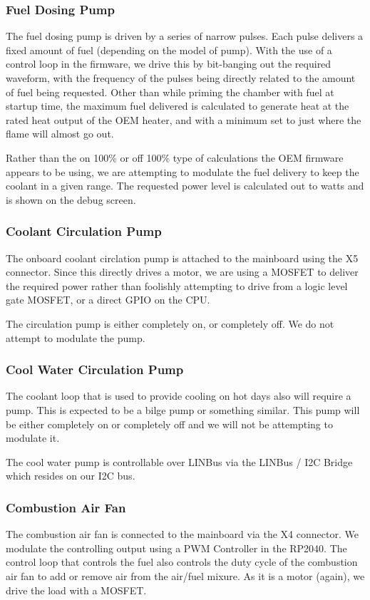 \documentclass[lettersize,journal]{IEEEtran}
\begin{document}
\subsubsection{Fuel Dosing Pump}
The fuel dosing pump is driven by a series of narrow pulses.  Each pulse delivers a fixed amount of fuel (depending on the model of pump).  With the use of a control loop in the firmware, we drive this by bit-banging out the required waveform, with the frequency of the pulses being directly related to the amount of fuel being requested.  Other than while priming the chamber with fuel at startup time, the maximum fuel delivered is calculated to generate heat at the rated heat output of the OEM heater, and with a minimum set to just where the flame will almost go out.

Rather than the on 100\% or off 100\% type of calculations the OEM firmware appears to be using, we are attempting to modulate the fuel delivery to keep the coolant in a given range.  The requested power level is calculated out to watts and is shown on the debug screen. 

\subsubsection{Coolant Circulation Pump}
The onboard coolant circlation pump is attached to the mainboard using the X5 connector.  Since this directly drives a motor, we are using a MOSFET to deliver the required power rather than foolishly attempting to drive from a logic level gate MOSFET, or a direct GPIO on the CPU.

The circulation pump is either completely on, or completely off.  We do not attempt to modulate the pump.

\subsubsection{Cool Water Circulation Pump}
The coolant loop that is used to provide cooling on hot days also will require a pump.  This is expected to be a bilge pump or something similar.  This pump will be either completely on or completely off and we will not be attempting to modulate it.

The cool water pump is controllable over LINBus via the LINBus / I2C Bridge which resides on our I2C bus.

\subsubsection{Combustion Air Fan}
The combustion air fan is connected to the mainboard via the X4 connector.  We modulate the controlling output using a PWM Controller in the RP2040.  The control loop that controls the fuel also controls the duty cycle of the combustion air fan to add or remove air from the air/fuel mixure.  As it is a motor (again), we drive the load with a MOSFET.
\end{document}
